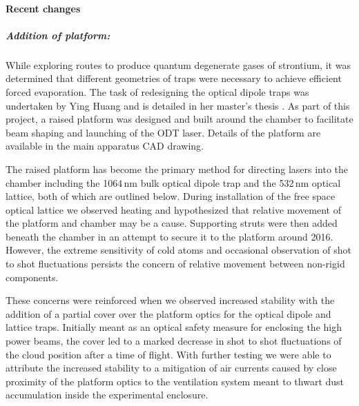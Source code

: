 


\paragraph{Recent changes}
\subparagraph{Addition of platform:}
While exploring routes to produce quantum degenerate gases of strontium, it was determined that different geometries of traps were necessary to achieve efficient forced evaporation. 
The task of redesigning the optical dipole traps was undertaken by Ying Huang and is detailed in her master's thesis \cite{Huang2013}. 
As part of this project, a raised platform was designed and built around the chamber to facilitate beam shaping and launching of the ODT laser.
Details of the platform are available in the main apparatus CAD drawing.

The raised platform has become the primary method for directing lasers into the chamber including the 1064\,nm bulk optical dipole trap and the 532\,nm optical lattice, both of which are outlined below. 
During installation of the free space optical lattice we observed heating and hypothesized that relative movement of the platform and chamber may be a cause.
Supporting struts were then added beneath the chamber in an attempt to secure it to the platform around 2016.
However, the extreme sensitivity of cold atoms and occasional observation of shot to shot fluctuations persists the concern of relative movement between non-rigid components.

These concerns were reinforced when we observed increased stability with the addition of a partial cover over the platform optics for the optical dipole and lattice traps. 
Initially meant as an optical safety measure for enclosing the high power beams, the cover led to a marked decrease in shot to shot fluctuations of the cloud position after a time of flight.
With further testing we were able to attribute the increased stability to a mitigation of air currents caused by close proximity of the platform optics to the ventilation system meant to thwart dust accumulation inside the experimental enclosure.

